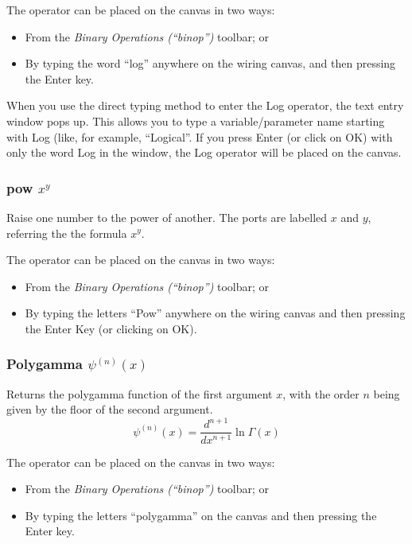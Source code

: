 The operator can be placed on the canvas in two ways:
\begin{itemize}
\item From the \emph{Binary Operations (``binop'')} toolbar; or 
\item By typing the word ``log'' anywhere on the wiring canvas, and then
pressing the Enter key. 
\end{itemize}
When you use the direct typing method to enter the Log operator, the
text entry window pops up. This allows you to type a variable/parameter
name starting with Log (like, for example, ``Logical''. If you press
Enter (or click on OK) with only the word Log in the window, the Log
operator will be placed on the canvas.

\subsubsection{pow $x^{y}$}


\label{Operation:pow} Raise one number to the power of another. The
ports are labelled $x$ and $y$, referring the the formula $x^{y}$.

The operator can be placed on the canvas in two ways:
\begin{itemize}
\item From the \emph{Binary Operations (``binop'')} toolbar; or 
\item By typing the letters ``Pow'' anywhere on the wiring canvas and then
pressing the Enter Key (or clicking on OK). 
\end{itemize}

\subsubsection{Polygamma $\psi^{(n)}(x)$}


\label{Operation:polygamma} Returns the polygamma function of the
first argument $x$, with the order $n$ being given by the floor
of the second argument. 
\[
\psi^{(n)}(x)=\frac{d^{n+1}}{dx^{n+1}}\ln\Gamma(x)
\]

The operator can be placed on the canvas in two ways:
\begin{itemize}
\item From the \emph{Binary Operations (``binop'')} toolbar; or 
\item By typing the letters ``polygamma'' on the canvas and then pressing
the Enter key.
\end{itemize}

